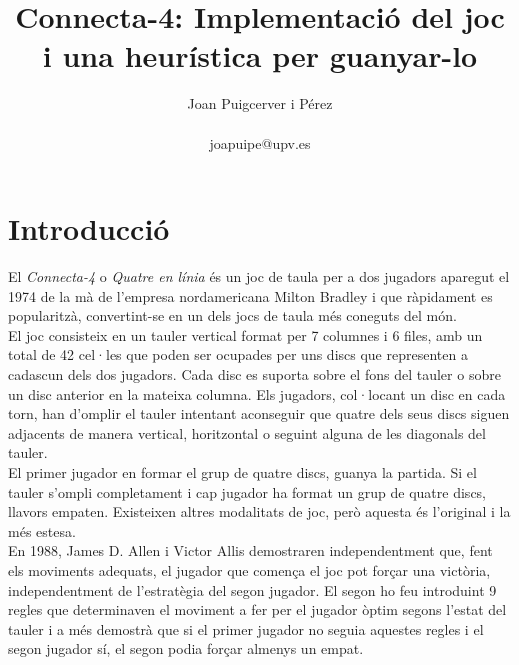\documentclass[12pt,a4paper]{article}
\author{Joan Puigcerver i Pérez\\
\begin{footnotesize}joapuipe@upv.es\end{footnotesize}}
\title{Connecta-4: Implementació del joc i una heurística per guanyar-lo}
\begin{document}
\maketitle
{}

\section{Introducció}
El \emph{Connecta-4} o \emph{Quatre en línia} és un joc de taula per a dos jugadors aparegut el 1974 de la mà de l'empresa nordamericana Milton Bradley i que ràpidament es popularitzà, convertint-se en un dels jocs de taula més coneguts del món.\\

El joc consisteix en un tauler vertical format per 7 columnes i 6 files, amb un total de 42 cel·les que poden ser ocupades per uns discs que representen a cadascun dels dos jugadors. Cada disc es suporta sobre el fons del tauler o sobre un disc anterior en la mateixa columna. Els jugadors, col·locant un disc en cada torn, han d'omplir el tauler intentant aconseguir que quatre dels seus discs siguen adjacents de manera vertical, horitzontal o seguint alguna de les diagonals del tauler.\\

El primer jugador en formar el grup de quatre discs, guanya la partida. Si el tauler s'ompli completament i cap jugador ha format un grup de quatre discs, llavors empaten. Existeixen altres modalitats de joc, però aquesta és l'original i la més estesa.\\

En 1988, James D. Allen\cite{allen1989note} i Victor Allis\cite{allis1988knowledge} demostraren independentment que, fent els moviments adequats, el jugador que comença el joc pot forçar una victòria, independentment de l'estratègia del segon jugador. El segon ho feu introduint 9 regles que determinaven el moviment a fer per el jugador òptim segons l'estat del tauler i a més demostrà que si el primer jugador no seguia aquestes regles i el segon jugador sí, el segon podia forçar almenys un empat.\\
\end{document}
